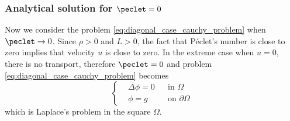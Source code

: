\subsubsection{Analytical solution for \texorpdfstring{$\peclet = 0$}{zero Péclet's number}}

Now we consider the problem \eqref{eq:diagonal_case_cauchy_problem} when $\peclet \to 0$. Since $\rho > 0$ and $L > 0$, the fact that Péclet's number is close to zero implies that velocity $u$ is close to zero. In the extreme case when $u = 0$, there is no transport, therefore $\peclet = 0$ and problem \eqref{eq:diagonal_case_cauchy_problem} becomes
\begin{equation} \label{eq:diagonal_case_cauchy_problem_zero_peclet}
	\left\{
	\begin{aligned}
		&\Delta \phi = 0 &
		&\text{in } \Omega \\
		&\phi = g &
		&\text{on } \partial \Omega
	\end{aligned}
	\right.
\end{equation}
which is Laplace's problem in the square $\Omega$. 